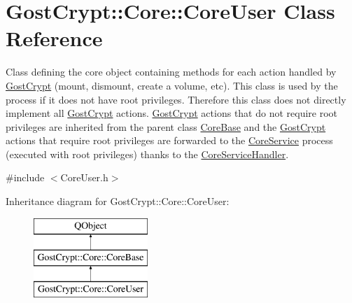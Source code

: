\hypertarget{class_gost_crypt_1_1_core_1_1_core_user}{}\section{Gost\+Crypt\+:\+:Core\+:\+:Core\+User Class Reference}
\label{class_gost_crypt_1_1_core_1_1_core_user}


Class defining the core object containing methods for each action handled by \hyperlink{namespace_gost_crypt}{Gost\+Crypt} (mount, dismount, create a volume, etc). This class is used by the process if it does not have root privileges. Therefore this class does not directly implement all \hyperlink{namespace_gost_crypt}{Gost\+Crypt} actions. \hyperlink{namespace_gost_crypt}{Gost\+Crypt} actions that do not require root privileges are inherited from the parent class \hyperlink{class_gost_crypt_1_1_core_1_1_core_base}{Core\+Base} and the \hyperlink{namespace_gost_crypt}{Gost\+Crypt} actions that require root privileges are forwarded to the \hyperlink{class_gost_crypt_1_1_core_1_1_core_service}{Core\+Service} process (executed with root privileges) thanks to the \hyperlink{class_gost_crypt_1_1_core_1_1_core_service_handler}{Core\+Service\+Handler}.  




{\ttfamily \#include $<$Core\+User.\+h$>$}

Inheritance diagram for Gost\+Crypt\+:\+:Core\+:\+:Core\+User\+:\begin{figure}[H]
\begin{center}
\leavevmode
\includegraphics[height=3.000000cm]{class_gost_crypt_1_1_core_1_1_core_user}
\end{center}
\end{figure}

